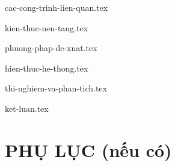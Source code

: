\documentclass[a4paper, 12pt]{article}
\theoremstyle{definition}
\begin{document}
{cac-cong-trinh-lien-quan.tex}
\pagebreak

{kien-thuc-nen-tang.tex}
\pagebreak

{phuong-phap-de-xuat.tex}
\pagebreak

{hien-thuc-he-thong.tex}
\pagebreak

{thi-nghiem-va-phan-tich.tex}
\pagebreak

{ket-luan.tex}
\pagebreak

\printbibliography[title={Tài liệu tham khảo}]
\pagebreak

\section*{PHỤ LỤC (nếu có)}
\end{document}
